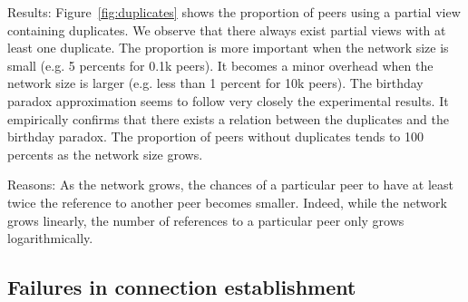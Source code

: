 \begin{asparadesc}
\item[Results:] Figure~\ref{fig:duplicates} shows the proportion of peers using
  a partial view containing duplicates. We observe that there always exist
  partial views with at least one duplicate. The proportion is more important
  when the network size is small (e.g. 5 percents for 0.1k peers). It becomes a
  minor overhead when the network size is larger (e.g. less than 1 percent for
  10k peers). The birthday paradox approximation seems to follow very closely
  the experimental results. It empirically confirms that there exists a relation
  between the duplicates and the birthday paradox. The proportion of peers
  without duplicates tends to 100 percents as the network size grows.
\item[Reasons:] As the network grows, the chances of a particular peer to have
  at least twice the reference to another peer becomes smaller. Indeed, while
  the network grows linearly, the number of references to a particular peer
  only grows logarithmically. %
\end{asparadesc}


\subsection{Failures in connection establishment}
\label{subsec:degeneration}


